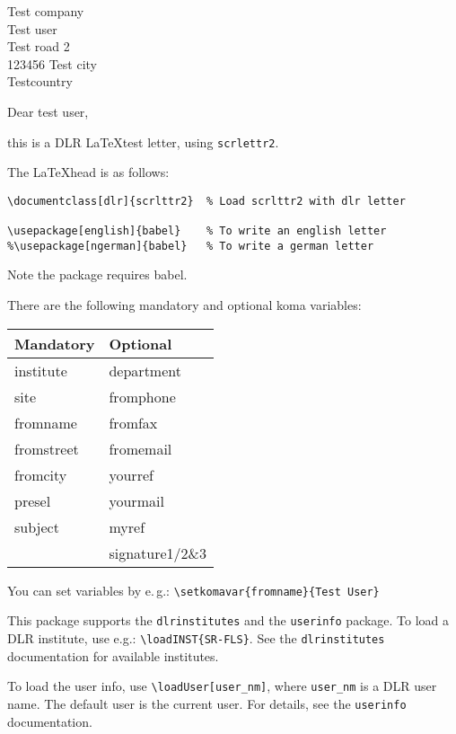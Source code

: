 \documentclass[dlr]{scrlttr2}
\begin{document}
\begin{letter}{Test company\\
               Test user\\
               Test road 2\\
               123456 Test city\\[1ex]
               Testcountry}
							
\opening{Dear test user,}

this is a DLR \LaTeX test letter, using \texttt{scrlettr2}.

The \LaTeX head is as follows:
\begin{lstlisting}
\documentclass[dlr]{scrlttr2}  % Load scrlttr2 with dlr letter

\usepackage[english]{babel}    % To write an english letter
%\usepackage[ngerman]{babel}   % To write a german letter
\end{lstlisting}
Note the package requires babel.

There are the following mandatory and optional koma variables:
\begin{center}
	\begin{tabular}{p{3cm}p{3cm}} \toprule
		\textbf{Mandatory} & \textbf{Optional} \\ \midrule
		institute		& department \\
		site				& fromphone  \\
		fromname		& fromfax		 \\
		fromstreet	& fromemail	 \\
		fromcity		& yourref	   \\
		presel			& yourmail	 \\
		subject			& myref 		 \\
								& signature1/2\&3 \\  \bottomrule
	\end{tabular}
\end{center}
You can set variables by e.\,g.: \texttt{\textbackslash setkomavar\{fromname\}\{Test User\}}

This package supports the \texttt{dlrinstitutes} and the \texttt{userinfo} package. To load a DLR institute, use e.g.: \texttt{\textbackslash loadINST\{SR-FLS\}}.  See the \texttt{dlrinstitutes} documentation for available institutes.

To load the user info, use \texttt{\textbackslash loadUser[user\_nm]}, where \texttt{user\_nm} is a DLR user name. The default user is the current user. For details, see the \texttt{userinfo} documentation.


\end{letter}
\end{document}
